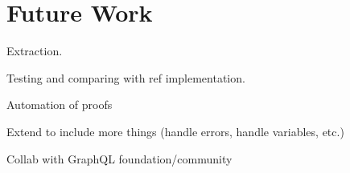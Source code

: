 \section{Future Work}\label{sec:future}

Extraction.

Testing and comparing with ref implementation.

Automation of proofs

Extend to include more things (handle errors, handle variables, etc.)

Collab with GraphQL foundation/community
